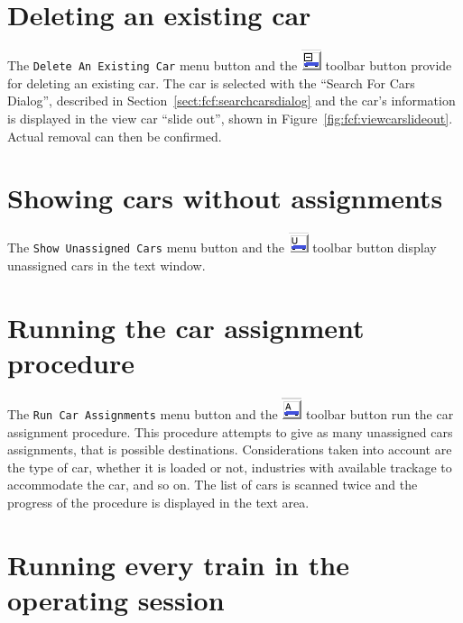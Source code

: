 \section{Deleting an existing car}

The \verb=Delete An Existing Car= menu button and the
\includegraphics{FCFDeleteCarTool.png} toolbar button provide for
deleting an existing car.  The car is selected with the ``Search For Cars
Dialog'', described in Section~\ref{sect:fcf:searchcarsdialog} and the
car's information is displayed in the view car ``slide out'', shown in
Figure~\ref{fig:fcf:viewcarslideout}. Actual removal can then be
confirmed.

\section{Showing cars without assignments}

The \verb=Show Unassigned Cars= menu button and the
\includegraphics{FCFShowUACarsTool.png} toolbar button display
unassigned cars in the text window.

\section{Running the car assignment procedure}

The \verb=Run Car Assignments= menu button and the
\includegraphics{FCFRunCarATool.png} toolbar button run the car
assignment procedure.  This procedure attempts to give as many
unassigned cars assignments, that is possible destinations. 
Considerations taken into account are the type of car, whether it is
loaded or not, industries with available trackage to accommodate the car,
and so on.  The list of cars is scanned twice and the progress of the
procedure is displayed in the text area.

\section{Running every train in the operating session}

